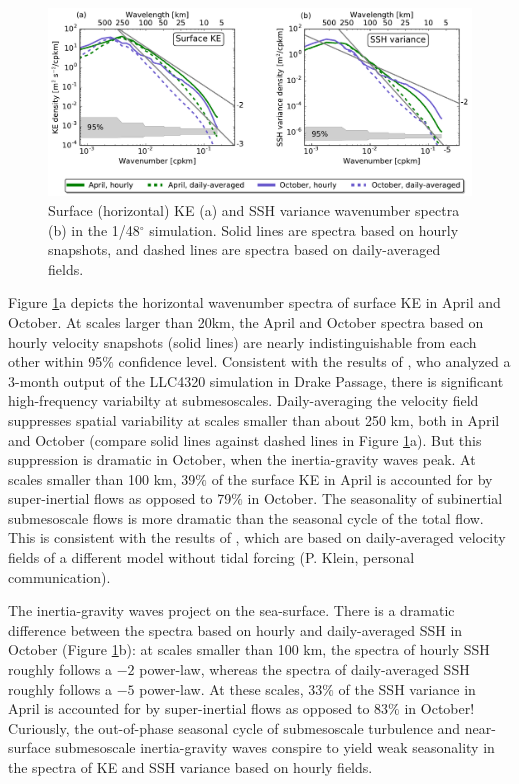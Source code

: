 \documentclass[grl]{agutex2015}
\begin{document}
\begin{article}
\begin{figure}[ht]
  \begin{center}
    \includegraphics[width=1.\textwidth]{figs/fig4.pdf}
 \caption{Surface (horizontal) KE (a) and SSH variance wavenumber spectra (b)
 in the 1/48$^\circ$ simulation. Solid lines
 are spectra based on hourly snapshots, and dashed lines are spectra based on daily-averaged
 fields.}
 \label{fig4}
 \end{center}
\end{figure}


Figure \ref{fig4}a depicts the horizontal wavenumber spectra of surface KE in
April and October. At scales larger than 20km, the April and October spectra based on hourly
velocity snapshots (solid lines) are nearly indistinguishable from each other within 95$\%$ confidence level.
Consistent with the results of
\citet{rocha_etal2016}, who analyzed a 3-month output of the LLC4320 simulation in Drake Passage,
there is significant high-frequency variabilty at submesoscales. Daily-averaging
the velocity field suppresses spatial variability at scales smaller than about 250
km, both in April and October (compare solid lines against dashed lines in Figure
\ref{fig4}a). But this suppression is dramatic in October, when the inertia-gravity waves peak. At scales
smaller than 100 km, 39$\%$ of the surface KE in April is accounted for by super-inertial
flows as opposed to 79$\%$ in October. The seasonality of subinertial submesoscale flows
is more dramatic than the seasonal cycle of the total flow. This is consistent
with the results of \citet{sasaki_etal2014}, which are
based on daily-averaged velocity fields of a different model without tidal forcing
(P. Klein, personal communication).

The inertia-gravity waves project on the sea-surface.
There is a dramatic difference between the spectra
based on hourly and daily-averaged SSH in October (Figure \ref{fig4}b): at scales smaller than 100 km, the spectra
of hourly SSH roughly follows a $-2$ power-law, whereas the spectra of daily-averaged
SSH roughly follows a $-5$ power-law. At these scales, 33$\%$ of the SSH variance in April is accounted for by super-inertial
flows as opposed to 83$\%$ in October! Curiously, the out-of-phase seasonal cycle of submesoscale
turbulence and near-surface submesoscale inertia-gravity waves conspire to yield weak seasonality
in the spectra of KE and SSH variance based on hourly fields.



\end{article}
\end{document}

